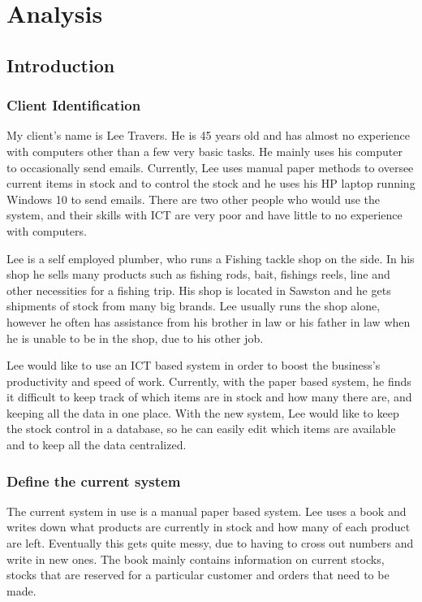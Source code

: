 \chapter{Analysis}

\section{Introduction}

\subsection{Client Identification}
My client's name is Lee Travers. He is 45 years old and has almost no experience with computers other than a few very basic tasks. He mainly uses his computer to occasionally send emails. Currently, Lee uses manual paper methods to oversee current items in stock and to control the stock and he uses his HP laptop running Windows 10 to send emails. There are two other people who would use the system, and their skills with ICT are very poor and have little to no experience with computers.

Lee is a self employed plumber, who runs a Fishing tackle shop on the side. In his shop he sells many products such as fishing rods, bait, fishings reels, line and other necessities for a fishing trip. His shop is located in Sawston and he gets shipments of stock from many big brands. Lee usually runs the shop alone, however he often has assistance from his brother in law or his father in law when he is unable to be in the shop, due to his other job.

Lee would like to use an ICT based system in order to boost the business's productivity and speed of work. Currently, with the paper based system, he finds it difficult to keep track of which items are in stock and how many there are, and keeping all the data in one place. With the new system, Lee would like to keep the stock control in a database, so he can easily edit which items are available and to keep all the data centralized.

\subsection{Define the current system}
The current system in use is a manual paper based system. Lee uses a book and writes down what products are currently in stock and how many of each product are left. Eventually this gets quite messy, due to having to cross out numbers and write in new ones. The book mainly contains information on current stocks, stocks that are reserved for a particular customer and orders that need to be made.

